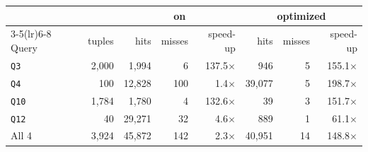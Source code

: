 \begin{tabular}{lrrrrrrr}
\toprule
 & & \multicolumn{3}{c}{on} & \multicolumn{3}{c}{optimized} \\
\cmidrule(lr){3-5}\cmidrule(lr){6-8}
Query & tuples & hits & misses & speed-up & hits & misses & speed-up \\
\midrule
\texttt{Q3} & 2,000 & 1,994 & 6 & 137.5$\times$ & 946 & 5 & 155.1$\times$ \\
\texttt{Q4} & 100 & 12,828 & 100 & 1.4$\times$ & 39,077 & 5 & 198.7$\times$ \\
\texttt{Q10} & 1,784 & 1,780 & 4 & 132.6$\times$ & 39 & 3 & 151.7$\times$ \\
\texttt{Q12} & 40 & 29,271 & 32 & 4.6$\times$ & 889 & 1 & 61.1$\times$ \\
\midrule
All 4 & 3,924 & 45,872 & 142 & 2.3$\times$ & 40,951 & 14 & 148.8$\times$ \\
\bottomrule
\end{tabular}
\par{}

